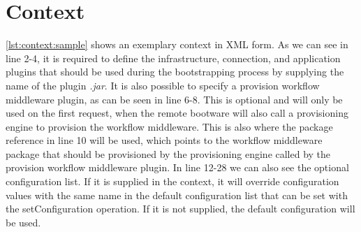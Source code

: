 \section{Context}
\label{implementation:context}

\vspace*{\baselineskip}

\autoref{lst:context:sample} shows an exemplary context in XML form.
As we can see in line 2-4, it is required to define the infrastructure, connection, and application plugins that should be used during the bootstrapping process by supplying the name of the plugin \textit{.jar}.
It is also possible to specify a provision workflow middleware plugin, as can be seen in line 6-8.
This is optional and will only be used on the first request, when the remote bootware will also call a provisioning engine to provision the workflow middleware.
This is also where the package reference in line 10 will be used, which points to the workflow middleware package that should be provisioned by the provisioning engine called by the provision workflow middleware plugin.
In line 12-28 we can also see the optional configuration list.
If it is supplied in the context, it will override configuration values with the same name in the default configuration list that can be set with the setConfiguration operation.
If it is not supplied, the default configuration will be used.
